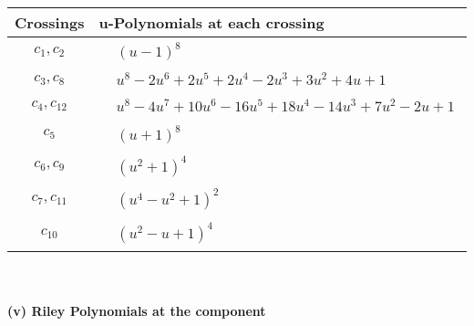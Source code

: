 \documentclass[1p]{elsarticle_modified}
\theoremstyle{definition}
\begin{document}
\begin{tabular}{m{50pt}|m{274pt}}
Crossings & \hspace{64pt}u-Polynomials at each crossing \\
\hline $$\begin{aligned}c_{1},c_{2}\end{aligned}$$&$\begin{aligned}
&(u-1)^8
\end{aligned}$\\
\hline $$\begin{aligned}c_{3},c_{8}\end{aligned}$$&$\begin{aligned}
&u^8-2 u^6+2 u^5+2 u^4-2 u^3+3 u^2+4 u+1
\end{aligned}$\\
\hline $$\begin{aligned}c_{4},c_{12}\end{aligned}$$&$\begin{aligned}
&u^8-4 u^7+10 u^6-16 u^5+18 u^4-14 u^3+7 u^2-2 u+1
\end{aligned}$\\
\hline $$\begin{aligned}c_{5}\end{aligned}$$&$\begin{aligned}
&(u+1)^8
\end{aligned}$\\
\hline $$\begin{aligned}c_{6},c_{9}\end{aligned}$$&$\begin{aligned}
&(u^2+1)^4
\end{aligned}$\\
\hline $$\begin{aligned}c_{7},c_{11}\end{aligned}$$&$\begin{aligned}
&(u^4- u^2+1)^2
\end{aligned}$\\
\hline $$\begin{aligned}c_{10}\end{aligned}$$&$\begin{aligned}
&(u^2- u+1)^4
\end{aligned}$\\
\hline
\end{tabular}\\~\\
\newpage\renewcommand{\arraystretch}{1}
\flushleft \textbf{(v) Riley Polynomials at the component}\newline \\
\end{document}
